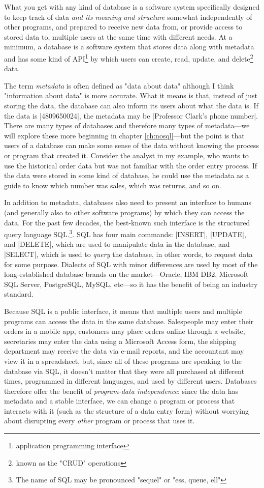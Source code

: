 \documentclass[11pt]{book}
\newcommand{\term}[1]{\emph{#1}} %
\begin{document}
What you get with any kind of database is a software system specifically designed to keep track of data \emph{and its meaning and structure} somewhat independently of other programs, and prepared to receive new data from, or provide access to stored data to, multiple users at the same time with different needs.  At a minimum, a database is a software system that stores data along with metadata and has some kind of API\footnote{application programming interface} by which users can create, read, update, and delete\footnote{known as the "CRUD" operations} data.

The term \term{metadata} is often defined as "data about data" although I think "information about data" is more accurate.  What it means is that, instead of just storing the data, the database can also inform its users about what the data is.  If the data is |4809650024|, the metadata may be |Professor Clark's phone number|.  There are many types of databases and therefore many types of metadata---we will explore these more beginning in chapter \ref{ch:nosql}---but the point is that users of a database can make some sense of the data without knowing the process or program that created it.  Consider the analyst in my example, who wants to use the historical order data but was not familiar with the order entry process.  If the data were stored in some kind of database, he could use the metadata as a guide to know which number was sales, which was returns, and so on.

In addition to metadata, databases also need to present an interface to humans (and generally also to other software programs) by which they can access the data.  For the past few decades, the best-known such interface is the structured query language SQL.\footnote{The name of SQL may be pronounced "sequel" or "ess, queue, ell"}.  SQL has four main commands: |INSERT|, |UPDATE|, and |DELETE|, which are used to manipulate data in the database, and |SELECT|, which is used to \term{query} the database, in other words, to request data for some purpose.  Dialects of SQL with minor differences are used by most of the long-established database brands on the market---Oracle, IBM DB2, Microsoft SQL Server, PostgreSQL, MySQL, etc---so it has the benefit of being an industry standard.

Because SQL is a public interface, it means that multiple users and multiple programs can access the data in the same database.  Salespeople may enter their orders in a mobile app, customers may place orders online through a website, secretaries may enter the data using a Microsoft Access form, the shipping department may receive the data via e-mail reports, and the accountant may view it in a spreadsheet, but, since all of these programs are speaking to the database via SQL, it doesn't matter that they were all purchased at different times, programmed in different languages, and used by different users.  Databases therefore offer the benefit of \term{program-data independence}: since the data has metadata and a stable interface, we can change a program or process that interacts with it (such as the structure of a data entry form) without worrying about disrupting every \emph{other} program or process that uses it.
\end{document}
